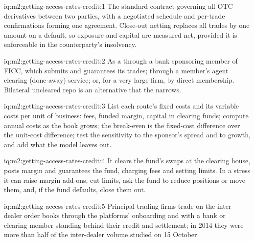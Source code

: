 \begin{solution}{iq:m2:getting-access-rates-credit:1}
The standard contract governing all OTC derivatives between two parties, with a
negotiated schedule and per-trade confirmations forming one agreement. Close-out
netting replaces all trades by one amount on a default, so exposure and capital are
measured net, provided it is enforceable in the counterparty's insolvency.
\end{solution}

\begin{solution}{iq:m2:getting-access-rates-credit:2}
As a  through a bank sponsoring member of FICC, which submits and
guarantees its trades; through a member's agent clearing (done-away) service; or, for a
very large firm, by direct membership. Bilateral uncleared repo is an alternative that
the  narrows.
\end{solution}

\begin{solution}{iq:m2:getting-access-rates-credit:3}
List each route's fixed costs and its variable costs per unit of business: fees,
funded margin, capital in clearing funds; compute annual costs as the book grows; the
break-even is the fixed-cost difference over the unit-cost difference; test the
sensitivity to the sponsor's spread and to growth, and add what the model leaves out.
\end{solution}

\begin{solution}{iq:m2:getting-access-rates-credit:4}
It clears the fund's swaps at the clearing house, posts margin and guarantees the fund,
charging fees and setting limits. In a stress it can raise margin add-ons, cut limits,
ask the fund to reduce positions or move them, and, if the fund defaults, close them out.
\end{solution}

\begin{solution}{iq:m2:getting-access-rates-credit:5}
Principal trading firms trade on the inter-dealer order books through the platforms'
onboarding and with a bank or clearing member standing behind their credit and
settlement; in 2014 they were more than half of the inter-dealer volume studied on 15
October.
\end{solution}


